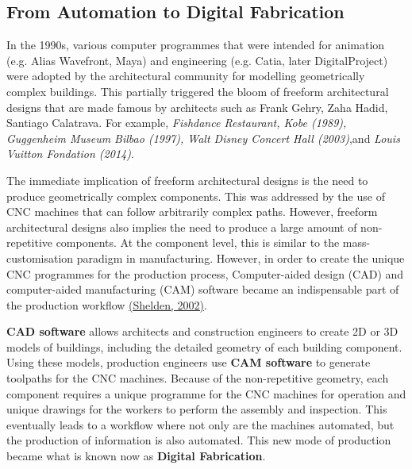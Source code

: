 \documentclass[11pt]{book}
\begin{document}
\subsection{From Automation to Digital Fabrication}

In the 1990s, various computer programmes that were intended for animation (e.g. Alias Wavefront, Maya) and engineering (e.g. Catia, later DigitalProject) were adopted by the architectural community for modelling geometrically complex buildings. This partially triggered the bloom of freeform architectural designs that are made famous by architects such as Frank Gehry, Zaha Hadid, Santiago Calatrava. For example, \textit{Fishdance Restaurant, Kobe (1989),  Guggenheim Museum Bilbao (1997), Walt Disney Concert Hall (2003)},and \textit{ Louis Vuitton Fondation (2014)}.\textit{ }

The immediate implication of freeform architectural designs is the need to produce geometrically complex components. This was addressed by the use of CNC machines that can follow arbitrarily complex paths. However, freeform architectural designs also implies the need to produce a large amount of non-repetitive components. At the component level, this is similar to the mass-customisation paradigm in manufacturing. However, in order to create the unique CNC programmes for the production process, Computer-aided design (CAD) and computer-aided manufacturing (CAM) software became an indispensable part of the production workflow \href{https://www.zotero.org/google-docs/?1igbdo}{(Shelden, 2002)}. 

\textbf{CAD software} allows architects and construction engineers to create 2D or 3D models of buildings, including the detailed geometry of each building component. Using these models, production engineers use \textbf{CAM software} to generate toolpaths for the CNC machines. Because of the non-repetitive geometry, each component requires a unique programme for the CNC machines for operation and unique drawings for the workers to perform the assembly and inspection. This eventually leads to a workflow where not only are the machines automated, but the production of information is also automated. This new mode of production became what is known now as \textbf{Digital Fabrication}.
\end{document}
